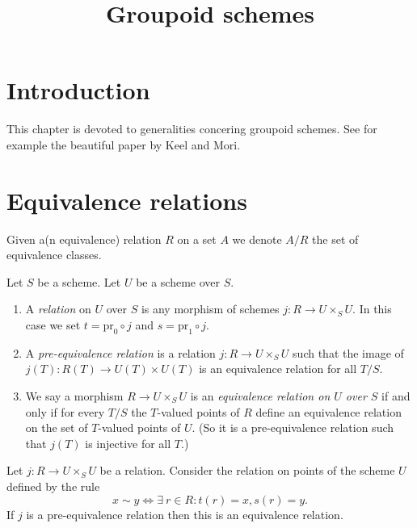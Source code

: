 

%


\title{Groupoid schemes}


\maketitle

\tableofcontents

\section{Introduction}
\label{section-introduction}

\noindent
This chapter is devoted to generalities concering groupoid schemes.
See for example the beautiful paper \cite{K-M} by Keel and Mori.








\section{Equivalence relations}
\label{section-equivalence-relations}

\noindent
Given a(n equivalence) relation $R$ on a set $A$ we denote
$A/R$ the set of equivalence classes.

\begin{definition}
\label{definition-equivalence-relation}
Let $S$ be a scheme. Let $U$ be a scheme over $S$.
\begin{enumerate}
\item A {\it relation} on $U$ over $S$ is any morphism
of schemes $j : R \to U \times_S U$. In this case we set
$t = \text{pr}_0 \circ j$ and $s = \text{pr}_1 \circ j$.
\item A {\it pre-equivalence relation} is a relation
$j : R \to U\times_SU$ such that the image of
$j(T) : R(T) \to U(T) \times U(T)$ is an equivalence relation for
all $T/S$.
\item We say a morphism $R \to U \times_S U$ is
an {\it equivalence relation on $U$ over $S$}
if and only if for every $T/S$ the $T$-valued
points of $R$ define an equivalence relation
on the set of $T$-valued points of $U$.
(So it is a pre-equivalence relation such that $j(T)$
is injective for all $T$.)
\end{enumerate}
\end{definition}

\begin{lemma}
\label{lemma-pre-equivalence-equivalence-relation-points}
Let $j : R \to U\times_S U$ be a relation.
Consider the relation on points of the scheme $U$ defined by
the rule
$$
x \sim y
\Leftrightarrow
\exists\ r \in R :
t(r) = x,
s(r) = y.
$$
If $j$ is a pre-equivalence relation then this is an
equivalence relation.
\end{lemma}

